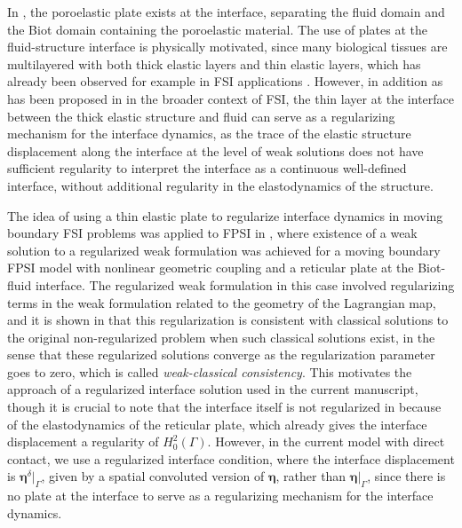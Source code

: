 \documentclass[11pt]{article}
\newcommand{\bd}{\boldsymbol}
\theoremstyle{definition}
\begin{document}
In \cite{BCMW21}, the poroelastic plate exists at the interface, separating the fluid domain and the Biot domain containing the poroelastic material. The use of plates at the fluid-structure interface is physically motivated, since many biological tissues are multilayered with both thick elastic layers and thin elastic layers, which has already been observed for example in FSI applications \cite{BorSunMultiLayered,YifanCMAME,FSIStent,BCMW21}. However, in addition as has been proposed in \cite{BorSunMultiLayered} in the broader context of FSI, the thin layer at the interface between the thick elastic structure and fluid can serve as a regularizing mechanism for the interface dynamics, as the trace of the elastic structure displacement along the interface at the level of weak solutions does not have sufficient regularity to interpret the interface as a continuous well-defined interface, without additional regularity in the elastodynamics of the structure. 

The idea of using a thin elastic plate to regularize interface dynamics in moving boundary FSI problems was applied to FPSI in \cite{NonlinearFPSI_CRM23, FPSIJMPA}, where existence of a weak solution to a regularized weak formulation was achieved for a moving boundary FPSI model with nonlinear geometric coupling and a reticular plate at the Biot-fluid interface. The regularized weak formulation in this case involved regularizing terms in the weak formulation related to the geometry of the Lagrangian map, and it is shown in \cite{FPSIJMPA} that this regularization is consistent with classical solutions to the original non-regularized problem when such classical solutions exist, in the sense that these regularized solutions converge as the regularization parameter goes to zero, which is called \textit{weak-classical consistency}. This motivates the approach of a regularized interface solution used in the current manuscript, though it is crucial to note that the interface itself is not regularized in \cite{FPSIJMPA} because of the elastodynamics of the reticular plate, which already gives the interface displacement a regularity of $H^{2}_{0}(\Gamma)$. However, in the current model with direct contact, we use a regularized interface condition, where the interface displacement is $\bd{\eta}^{\delta}|_{\Gamma}$, given by a spatial convoluted version of $\bd{\eta}$, rather than $\bd{\eta}|_{\Gamma}$, since there is no plate at the interface to serve as a regularizing mechanism for the interface dynamics.
\end{document}
